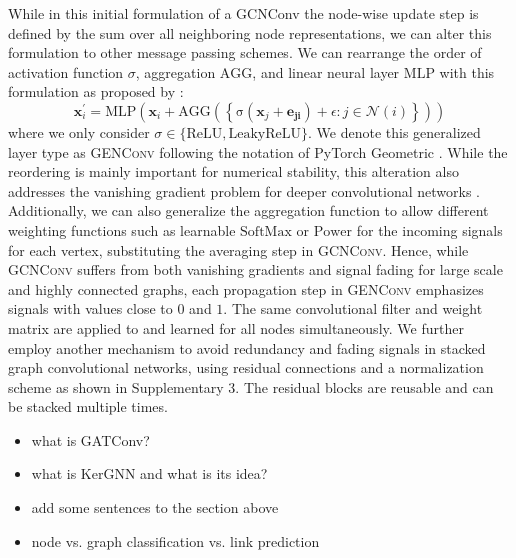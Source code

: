\documentclass[]{article}
\renewcommand{\cite}{\citep}
\begin{document}
While in this initial formulation of a GCNConv the node-wise update
step is defined by the sum over all neighboring node representations,
we can alter this formulation to other message passing schemes.  We
can rearrange the order of activation function $\sigma$, aggregation
$\mathrm{AGG}$, and linear neural layer $\mathrm{MLP}$ with this
formulation as proposed by \cite{GENConv2020}:
\begin{equation}
	\mathbf{x}_i^{\prime} = \mathrm{MLP} \left( \mathbf{x}_i +
	\mathrm{AGG} \left( \left\{
	\mathrm{\sigma} \left( \mathbf{x}_j + \mathbf{e_{ji}} \right) +\epsilon
	: j \in \mathcal{N}(i) \right\} \right)
	\right)
\end{equation}
where we only consider
$\sigma \in \{\mathrm{ReLU}, \mathrm{LeakyReLU}\}$. We denote this
generalized layer type as \textsc{GENConv} following the notation of
PyTorch Geometric \cite{PytorchGeometric}.  While the reordering is
mainly important for numerical stability, this alteration also addresses
the vanishing gradient problem for deeper convolutional networks
\cite{GENConv2020}. Additionally, we can also generalize the
aggregation function to allow different weighting functions such as
learnable $\mathrm{SoftMax}$ or $\mathrm{Power}$ for the incoming
signals for each vertex, substituting the averaging step in
\textsc{GCNConv}. Hence, while \textsc{GCNConv} suffers from both
vanishing gradients and signal fading for large scale and highly
connected graphs, each propagation step in \textsc{GENConv} emphasizes
signals with values close to $0$ and $1$. The same convolutional
filter and weight matrix are applied to and learned for all nodes
simultaneously. %
We further employ another mechanism to avoid redundancy and fading
signals in stacked graph convolutional networks, using residual
connections and a normalization scheme \cite{DeepGCN2019}
	\cite{GENConv2020} as shown in Supplementary 3.  The residual
blocks are reusable and can be stacked multiple times.

\begin{itemize}
	\item what is GATConv?
	\item what is KerGNN and what is its idea?
	\item add some sentences to the section above
	\item node vs. graph classification vs. link prediction
\end{itemize}
\end{document}
